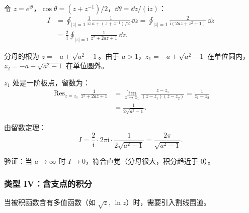 \begin{example}
令 $z=e^{\mathrm{i}\theta}$，$\cos\theta = (z+z^{-1})/2$，$\dd\theta = \dd z/(\mathrm{i}z)$：
\begin{align*}
I &= \oint_{|z|=1} \frac{1}{\mathrm{i}z}\frac{1}{a + (z+z^{-1})/2}\,\dd z
= \oint_{|z|=1} \frac{2}{\mathrm{i}(2az + z^2 + 1)}\,\dd z \\
&= \frac{2}{\mathrm{i}}\oint_{|z|=1} \frac{1}{z^2 + 2az + 1}\,\dd z.
\end{align*}

分母的根为 $z = -a \pm \sqrt{a^2-1}$。由于 $a>1$，$z_1 = -a + \sqrt{a^2-1}$ 在单位圆内，$z_2 = -a - \sqrt{a^2-1}$ 在单位圆外。

$z_1$ 处是一阶极点，留数为：
\begin{align*}
\mathop{\mathrm{Res}}_{z=z_1} \frac{1}{z^2+2az+1}
&= \lim_{z\to z_1} \frac{z-z_1}{(z-z_1)(z-z_2)} = \frac{1}{z_1 - z_2} \\
&= \frac{1}{2\sqrt{a^2-1}}.
\end{align*}

由留数定理：
\begin{equation}
I = \frac{2}{\mathrm{i}} \cdot 2\pi\mathrm{i} \cdot \frac{1}{2\sqrt{a^2-1}}
= \frac{2\pi}{\sqrt{a^2-1}}.
\end{equation}

验证：当 $a\to\infty$ 时 $I\to0$，符合直觉（分母很大，积分趋近于 0）。
\end{example}

\subsubsection{类型 IV：含支点的积分}

当被积函数含有多值函数（如 $\sqrt{z}$, $\ln z$）时，需要引入割线围道。

